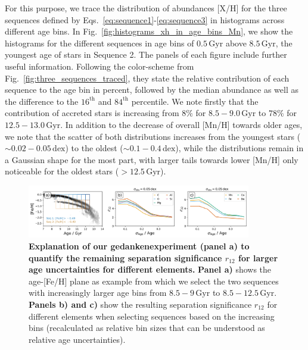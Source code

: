 \documentclass[fleqn,usenatbib]{mnras}
\begin{document}
For this purpose, we trace the distribution of abundances [X/H] for the three sequences defined by Eqs.~\ref{eq:sequence1}-\ref{eq:sequence3} in histograms across different age bins. In Fig.~\ref{fig:histograms_xh_in_age_bins_Mn}, we show the histograms for the different sequences in age bins of $0.5\,\mathrm{Gyr}$ above $8.5\,\mathrm{Gyr}$, the youngest age of stars in Sequence 2. The panels of each figure include further useful information. Following the color-scheme from Fig.~\ref{fig:three_sequences_traced}, they state the relative contribution of each sequence to the age bin in percent, followed by the median abundance as well as the difference to the $16^\mathrm{th}$ and $84^\mathrm{th}$ percentile. We note firstly that the contribution of accreted stars is increasing from $8\%$ for $8.5-9.0\,\mathrm{Gyr}$ to $78\%$ for $12.5-13.0\,\mathrm{Gyr}$. In addition to the decrease of overall [Mn/H] towards older ages, we note that the scatter of both distributions increases from the youngest stars ($\sim 0.02-0.05\,\mathrm{dex}$) to the oldest ($\sim 0.1-0.4\,\mathrm{dex}$), while the distributions remain in a Gaussian shape for the most part, with larger tails towards lower [Mn/H] only noticeable for the oldest stars ($> 12.5\,\mathrm{Gyr}$).

\begin{figure}
	\includegraphics[width=0.87\textwidth]{figures/age_sigma_vs_r.png}
    \caption{
    \textbf{Explanation of our gedankenexperiment (panel a) to quantify the remaining separation significance $r_{12}$ for larger age uncertainties for different elements.}
    \textbf{Panel a)} shows the age-{[Fe/H]} plane as example from which we select the two sequences with increasingly larger age bins from $8.5-9\,\mathrm{Gyr}$ to $8.5-12.5\,\mathrm{Gyr}$. \textbf{Panels b) and c)} show the resulting separation significance $r_{12}$ for different elements when selecting sequences based on the increasing bins (recalculated as relative bin sizes that can be understood as relative age uncertainties).
    }
    \label{fig:age_sigma_vs_r}
\end{figure}
\end{document}
